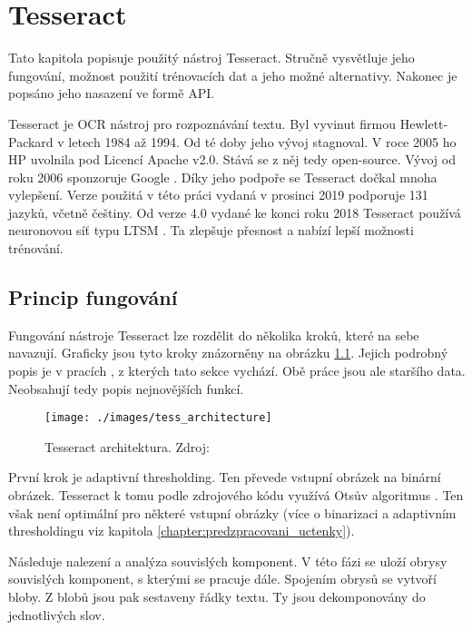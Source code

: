 \documentclass[thesis=B,czech]{FITthesis}[2019/12/23]
\begin{document}
\chapter{Tesseract}
\label{chapter:tesseract}
Tato kapitola popisuje použitý nástroj Tesseract. Stručně vysvětluje jeho fungování, možnost použití trénovacích dat a jeho možné alternativy. Nakonec je popsáno jeho nasazení ve formě API.

Tesseract je OCR nástroj pro rozpoznávání textu. Byl vyvinut firmou Hewlett-Packard v letech 1984 až 1994. Od té doby jeho vývoj stagnoval. V roce  2005 ho HP uvolnila pod Licencí Apache v2.0. Stává se z něj tedy  open-source. Vývoj od roku 2006 sponzoruje Google \cite{tessopensourced}. Díky jeho podpoře se Tesseract dočkal mnoha vylepšení. Verze použitá v této práci \cite{smithTesseract2005} vydaná v prosinci 2019 podporuje 131 jazyků, včetně češtiny. Od verze 4.0 vydané ke konci roku 2018 Tesseract používá neuronovou síť typu LTSM \cite{tessltsm}. Ta zlepšuje přesnost a nabízí lepší možnosti trénování.

\section{Princip fungování}
Fungování nástroje Tesseract lze rozdělit do několika kroků, které na sebe navazují. Graficky jsou tyto kroky znázorněny na obrázku \ref{fig:tess_architecture}.
Jejich podrobný popis je v pracích \cite{Smith2007, Patel2012}, z kterých tato sekce vychází. Obě práce jsou ale staršího data. Neobsahují tedy popis nejnovějších funkcí.

\begin{figure}[h]\centering
	\texttt{[image: ./images/tess\_architecture]}
	\caption[Tesseract architektura]{Tesseract architektura. Zdroj:  \cite[překresleno, přeloženo]{Patel2012}}\label{fig:tess_architecture}
\end{figure}

První krok je adaptivní thresholding. Ten převede vstupní obrázek na binární obrázek. Tesseract k tomu podle zdrojového kódu \cite{smithTesseractThresholder2019} využívá Otsův algoritmus \cite{Otsu1979a}. Ten však není optimální pro některé vstupní obrázky (více o binarizaci a adaptivním thresholdingu viz kapitola \ref{chapter:predzpracovani_uctenky}).

Následuje nalezení a analýza souvislých komponent. V této fázi se uloží obrysy souvislých komponent, s kterými se pracuje dále. Spojením obrysů se vytvoří bloby. Z blobů jsou pak sestaveny řádky textu. Ty jsou dekomponovány do jednotlivých slov.
\end{document}
